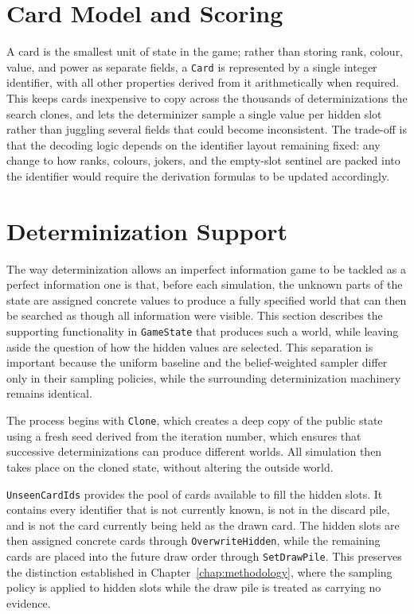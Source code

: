 \documentclass[12pt,a4paper,oneside]{report}
\begin{document}
\section{Card Model and Scoring}
\label{sec:card-model}

A card is the smallest unit of state in the game; rather than storing rank, colour, value, and power as separate fields, a \texttt{Card} is represented by a single integer identifier, with all other properties derived from it arithmetically when required. This keeps cards inexpensive to copy across the thousands of determinizations the search clones, and lets the determinizer sample a single value per hidden slot rather than juggling several fields that could become inconsistent. The trade-off is that the decoding logic depends on the identifier layout remaining fixed: any change to how ranks, colours, jokers, and the empty-slot sentinel are packed into the identifier would require the derivation formulas to be updated accordingly.


\section{Determinization Support}
\label{sec:determinization}

The way determinization allows an imperfect information game to be tackled as a perfect information one is that, before each simulation, the unknown parts of the state are assigned concrete values to produce a fully specified world that can then be searched as though all information were visible. This section describes the supporting functionality in \texttt{GameState} that produces such a world, while leaving aside the question of how the hidden values are selected. This separation is important because the uniform baseline and the belief-weighted sampler differ only in their sampling policies, while the surrounding determinization machinery remains identical.

The process begins with \texttt{Clone}, which creates a deep copy of the public state using a fresh seed derived from the iteration number, which ensures that successive determinizations can produce different worlds. All simulation then takes place on the cloned state, without altering the outside world. 

\texttt{UnseenCardIds} provides the pool of cards available to fill the hidden slots. It contains every identifier that is not currently known, is not in the discard pile, and is not the card currently being held as the drawn card. The hidden slots are then assigned concrete cards through \texttt{OverwriteHidden}, while the remaining cards are placed into the future draw order through \texttt{SetDrawPile}. This preserves the distinction established in Chapter~\ref{chap:methodology}, where the sampling policy is applied to hidden slots while the draw pile is treated as carrying no evidence.
\end{document}
